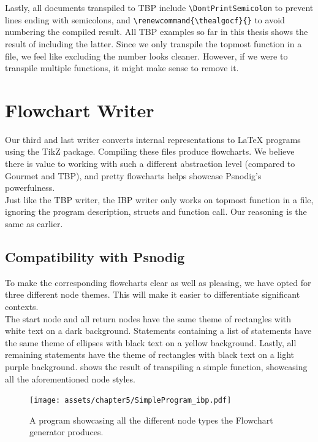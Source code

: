 Lastly, all documents transpiled to TBP include \texttt{\textbackslash DontPrintSemicolon} to prevent lines ending with semicolons, and \texttt{\textbackslash renewcommand\{\textbackslash thealgocf\}\{\}} to avoid numbering the compiled result. All TBP examples so far in this thesis shows the result of including the latter. Since we only transpile the topmost function in a file, we feel like excluding the number looks cleaner. However, if we were to transpile multiple functions, it might make sense to remove it.

\section{Flowchart Writer}

Our third and last writer converts internal representations to LaTeX programs using the TikZ package. Compiling these files produce flowcharts. We believe there is value to working with such a different abstraction level (compared to Gourmet and TBP), and pretty flowcharts helps showcase Psnodig's powerfulness. \\

Just like the TBP writer, the IBP writer only works on topmost function in a file, ignoring the program description, structs and function call. Our reasoning is the same as earlier. \\

\subsection{Compatibility with Psnodig}

To make the corresponding flowcharts clear as well as pleasing, we have opted for three different node themes. This will make it easier to differentiate significant contexts. \\

The start node and all return nodes have the same theme of rectangles with white text on a dark background. Statements containing a list of statements have the same theme of ellipses with black text on a yellow background. Lastly, all remaining statements have the theme of rectangles with black text on a light purple background.  shows the result of transpiling a simple function, showcasing all the aforementioned node styles. \\

\begin{figure}[ht]
    \centering
    \texttt{[image: assets/chapter5/SimpleProgram\_ibp.pdf]}
    \caption{A program showcasing all the different node types the Flowchart generator produces.}
    \label{flowchartColours}
\end{figure}

